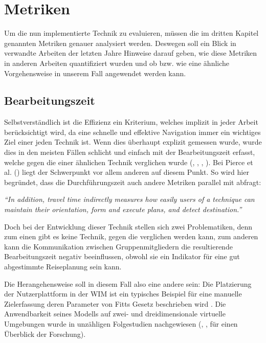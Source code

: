 \section{Metriken}
Um die nun implementierte Technik zu evaluieren, müssen die im dritten Kapitel genannten Metriken genauer analysiert werden. Deswegen soll ein Blick in verwandte Arbeiten der letzten Jahre Hinweise darauf geben, wie diese Metriken in anderen Arbeiten quantifiziert wurden und ob bzw. wie eine ähnliche Vorgehensweise in unserem Fall angewendet werden kann.

\subsection{Bearbeitungszeit}
Selbstverständlich ist die Effizienz ein Kriterium, welches implizit in jeder Arbeit berücksichtigt wird, da eine schnelle und effektive Navigation immer ein wichtiges Ziel einer jeden Technik ist. Wenn dies überhaupt explizit gemessen wurde, wurde dies in den meisten Fällen schlicht und einfach mit der Bearbeitungszeit erfasst, welche gegen die einer ähnlichen Technik verglichen wurde (\cite{Suma2010EvaluationEnvironments}, \cite{Kopper2006DesignEnvironments}, \cite{3_Pierce1997}, \cite{Wingrave2006OvercomingWIM}). 
Bei Pierce et al. (\cite{3_Pierce1997}) liegt der Schwerpunkt vor allem anderen auf diesem Punkt. So wird hier begründet, dass die Durchführungszeit auch andere Metriken parallel mit abfragt:

\begin{addmargin}[25pt]{0pt} 

\textit{“In addition, travel time indirectly measures how easily users of a technique can maintain their orientation, form and execute plans, and detect destination.”}\cite{3_Pierce1997}

\end{addmargin}

Doch bei der Entwicklung dieser Technik stellen sich zwei Problematiken, denn zum einen gibt es keine Technik, gegen die verglichen werden kann, zum anderen kann die Kommunikation zwischen Gruppenmitgliedern die resultierende Bearbeitungszeit negativ beeinflussen, obwohl sie ein Indikator für eine gut abgestimmte Reiseplanung sein kann.

Die Herangehensweise soll in diesem Fall also eine andere sein:
Die Platzierung der Nutzerplattform in der WIM ist ein typisches Beispiel für eine manuelle Zielerfassung deren Parameter von Fitts Gesetz beschrieben wird \cite{fitts1954information}.
Die Anwendbarkeit seines Modells auf zwei- und dreidimensionale virtuelle Umgebungen wurde in unzähligen Folgestudien nachgewiesen (\cite{mackenzie1992fitts}, \cite{drewes2010only}, \cite{zhai2004characterizing} für einen Überblick der Forschung).

